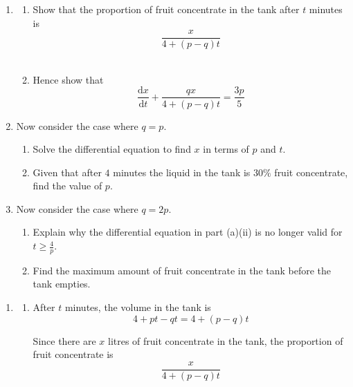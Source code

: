 \documentclass[leqno]{article}
\begin{document}
\begin{enumerate}[
  label=\textbf{\arabic*.},
  leftmargin=*,
  topsep=0pt,
  partopsep=0pt,
  parsep=0pt
]
\begin{enumerate}[label=\textbf{(\alph*)}]
  \item
  \begin{enumerate}[label=(\roman*)]
    \item Show that the proportion of fruit concentrate in the tank after $t$ minutes is
    \[
    \frac{x}{4+(p-q)t}
    \]
     \\
    \item Hence show that
    \[
    \frac{\mathrm{d}x}{\mathrm{d}t}+\frac{q x}{4+(p-q)t}=\frac{3p}{5}
    \]
  \end{enumerate}
  \item Now consider the case where $q=p$. \\
  \begin{enumerate}[label=(\roman*)]
    \item Solve the differential equation to find $x$ in terms of $p$ and $t$.  \\
    \item Given that after $4$ minutes the liquid in the tank is $30\%$ fruit concentrate, find the value of $p$.  \\
  \end{enumerate}
  \item Now consider the case where $q=2p$. \\
  \begin{enumerate}[label=(\roman*)]
    \item Explain why the differential equation in part (a)(ii) is no longer valid for $t\geq \frac{4}{p}$.  \\
    \item Find the maximum amount of fruit concentrate in the tank before the tank empties.  \\
  \end{enumerate}
\end{enumerate}

\vspace*{10pt}

\begin{djsSolution}
\begin{enumerate}[label=\textbf{(\alph*)}]
  \item
  \begin{enumerate}[label=(\roman*)]
    \item
    After $t$ minutes, the volume in the tank is
    \[
    4+pt-qt=4+(p-q)t
    \]

    Since there are $x$ litres of fruit concentrate in the tank, the proportion of fruit concentrate is
    \[
    \frac{x}{4+(p-q)t}
    \]


\end{enumerate}
\end{enumerate}
\end{djsSolution}
\end{enumerate}
\end{document}
